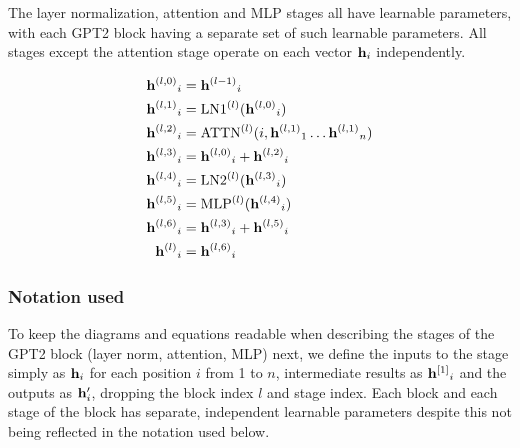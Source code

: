 The layer normalization, attention and MLP stages all have learnable parameters, with each GPT2 block having a separate set of such learnable parameters. All stages except the attention stage operate on each vector ${\mathbf{h}}_i$ independently.


\begin{align}
	{{\mathbf{h}}^{(l, 0)}}_i &= {{\mathbf{h}}^{(l-1)}}_i
	\label{eq:gpt2_overview_start}
	\\
	{{\mathbf{h}}^{(l, 1)}}_i &= \mathrm{LN1}{^{(l)}}({{\mathbf{h}}^{(l, 0)}}_i)
	\label{eq:gpt2_overview_ln1}
	\\
	{{\mathbf{h}}^{(l, 2)}}_i &= \mathrm{ATTN}{^{(l)}}(i, {{\mathbf{h}}^{(l, 1)}}_1 \ldots {{\mathbf{h}}^{(l, 1)}}_n)
	\label{eq:gpt2_overview_attn}
	\\
	{{\mathbf{h}}^{(l, 3)}}_i &= {{\mathbf{h}}^{(l, 0)}}_i + {{\mathbf{h}}^{(l, 2)}}_i
	\label{eq:gpt2_overview_res1}
	\\
	{{\mathbf{h}}^{(l, 4)}}_i &= \mathrm{LN2}{^{(l)}}({{\mathbf{h}}^{(l, 3)}}_i)
	\label{eq:gpt2_overview_ln2}
	\\
	{{\mathbf{h}}^{(l, 5)}}_i &= \mathrm{MLP}{^{(l)}}({{\mathbf{h}}^{(l, 4)}}_i)
	\label{eq:gpt2_overview_mlp}
	\\
	{{\mathbf{h}}^{(l, 6)}}_i &= {{\mathbf{h}}^{(l, 3)}}_i + {{\mathbf{h}}^{(l, 5)}}_i
	\label{eq:gpt2_overview_res2}
	\\
	{{\mathbf{h}}^{(l)}}_i &= {{\mathbf{h}}^{(l, 6)}}_i
	\label{eq:gpt2_overview_end}
\end{align}




\subsubsection{Notation used}
\label{gpt2:notation}

To keep the diagrams and equations readable when describing the stages of the GPT2 block (layer norm, attention, MLP) next, we define the inputs to the stage simply as ${\mathbf{h}}_i$ for each position $i$ from 1 to $n$, intermediate results as ${{\mathbf{h}}^{[1]}}_i$ and the outputs as ${\mathbf{h}}'_i$, dropping the block index $l$ and stage index.
Each block and each stage of the block has separate, independent learnable parameters despite this not being reflected in the notation used below.

